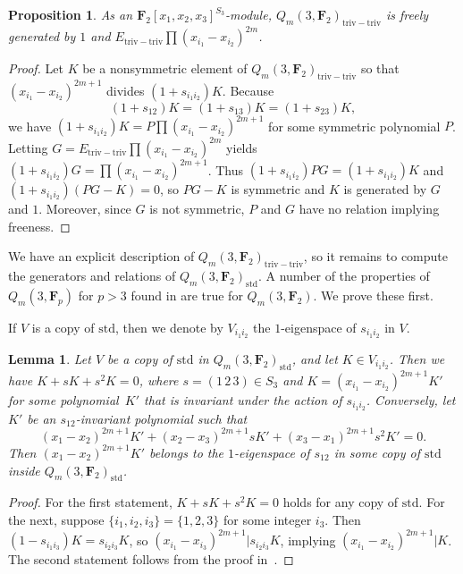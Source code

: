\documentclass[pdftex]{sigma}
\newtheorem{Lemma}[Theorem]{Lemma}
\newtheorem{Proposition}[Theorem]{Proposition}
\theoremstyle{definition}
\numberwithin{equation}{section}
\newcommand{\triv}{\mathrm{triv}}
\newcommand{\std}{\mathrm{std}}
\newcommand{\trtr}{\mathrm{triv-triv}}
\begin{document}
\begin{Proposition}\label{prop:trivtriv}
 As an $\mathbf{F}_2[x_1,x_2,x_3]^{S_3}$-module, $Q_m(3,\mathbf{F}_2)_{\triv-\triv}$ is freely generated by $1$ and $E_{\trtr}\prod(x_{i_1}-x_{i_2})^{2m}$.
\end{Proposition}
\begin{proof}
 Let $K$ be a nonsymmetric element of $Q_m(3,\mathbf{F}_2)_{\triv-\triv}$ so that $(x_{i_1}-x_{i_2})^{2m+1}$ divides $(1+s_{i_1i_2})K$. Because
 \[(1+s_{12})K=(1+s_{13})K=(1+s_{23})K,\]
 we have $(1+s_{i_1i_2})K = P\prod (x_{i_1}-x_{i_2})^{2m+1}$ for some symmetric polynomial $P$. Letting $G=E_{\trtr}\prod (x_{i_1}-x_{i_2})^{2m}$ yields $(1+s_{i_1i_2})G = \prod (x_{i_1}-x_{i_2})^{2m+1}$. Thus $(1+s_{i_1i_2})PG = (1+s_{i_1i_2})K$ and $(1+s_{i_1i_2})(PG-K)=0$, so $PG-K$ is symmetric and $K$ is generated by $G$ and $1$. Moreover, since $G$ is not symmetric, $P$ and $G$ have no relation implying freeness.
\end{proof}

We have an explicit description of $Q_m(3,\mathbf{F}_2)_\trtr$, so it remains to compute the generators and relations of $Q_m(3,\mathbf{F}_2)_\std$. A number of the properties of $Q_m(3,\mathbf{F}_p)$ for $p>3$ found in \cite{wang2022explicit} are true for $Q_m(3,\mathbf{F}_2)$. We prove these first.

If $V$ is a copy of $\std$, then we denote by $V_{i_1i_2}$ the $1$-eigenspace of $s_{i_1i_2}$ in $V$.

\begin{Lemma}
 Let $V$ be a copy of $\std$ in $Q_m(3,\mathbf{F}_2)_{\std}$, and let $K\in V_{i_1i_2}$. Then we have ${K+sK+s^2K}=0$, where $s=(1\,2\,3)\in S_3$ and $K=(x_{i_1}-x_{i_2})^{2m+1}K'$ for some polynomial~$K'$ that is invariant under the action of $s_{i_1i_2}$. Conversely, let $K'$ be an $s_{12}$-invariant polynomial such that
 \[(x_1-x_2)^{2m+1}K'+(x_2-x_3)^{2m+1}sK'+(x_3-x_1)^{2m+1}s^2K'=0.\]
 Then $(x_1-x_2)^{2m+1}K'$ belongs to the $1$-eigenspace of $s_{12}$ in some copy of $\std$ inside $Q_m(3,\mathbf{F}_2)_\std$.
\end{Lemma}
\begin{proof}
 For the first statement, $K+sK+s^2K=0$ holds for any copy of $\std$. For the next, suppose $\{i_1,i_2,i_3\} = \{1,2,3\}$ for some integer $i_3$. Then $(1-s_{i_1i_3})K = s_{i_2i_3}K$, so $(x_{i_1}-x_{i_3})^{2m+1}|s_{i_2i_3}K$, implying $(x_{i_1}-x_{i_2})^{2m+1}|K$.
 The second statement follows from the proof in~\cite{wang2022explicit}.
\end{proof}
\end{document}
